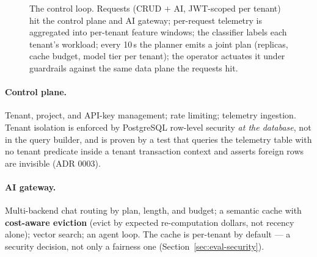 \begin{figure}[htbp]
{%
}
\caption{The \polyforge{} control loop. Requests (CRUD $+$ AI, JWT-scoped per
tenant) hit the control plane and AI gateway; per-request telemetry is
aggregated into per-tenant feature windows; the classifier labels each
tenant's workload; every 10\,s the \jcac{} planner emits a joint plan
(replicas, cache budget, model tier per tenant); the operator actuates it
under guardrails against the same data plane the requests hit.}
\label{fig:architecture}
\end{figure}

\paragraph{Control plane.} Tenant, project, and API-key management; rate
limiting; telemetry ingestion. Tenant isolation is enforced by PostgreSQL
row-level security \emph{at the database}, not in the query builder, and is
proven by a test that queries the telemetry table with no tenant predicate
inside a tenant transaction context and asserts foreign rows are invisible
(ADR 0003).

\paragraph{AI gateway.} Multi-backend chat routing by plan, length, and
budget; a semantic cache with \textbf{cost-aware eviction} (evict by
expected re-computation dollars, not recency alone); vector search; an agent
loop. The cache is per-tenant by default --- a security decision, not only a
fairness one (Section~\ref{sec:eval-security}).


